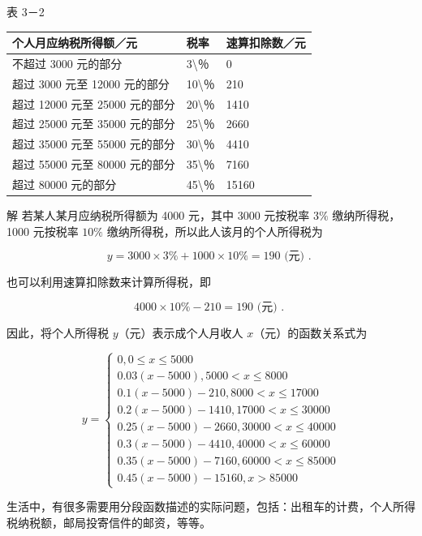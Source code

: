 \documentclass[10pt]{article}
\begin{document}
表 3－2

\begin{center}
\begin{tabular}{|l|l|l|}
\hline
个人月应纳税所得额／元 & 税率 & 速算扣除数／元 \\
\hline
不超过 3000 元的部分 & 3\textbackslash ％ & 0 \\
\hline
超过 3000 元至 12000 元的部分 & 10\textbackslash ％ & 210 \\
\hline
超过 12000 元至 25000 元的部分 & 20\textbackslash ％ & 1410 \\
\hline
超过 25000 元至 35000 元的部分 & 25\textbackslash ％ & 2660 \\
\hline
超过 35000 元至 55000 元的部分 & 30\textbackslash ％ & 4410 \\
\hline
超过 55000 元至 80000 元的部分 & 35\textbackslash ％ & 7160 \\
\hline
超过 80000 元的部分 & 45\textbackslash ％ & 15160 \\
\hline
\end{tabular}
\end{center}

解 若某人某月应纳税所得额为 4000 元，其中 3000 元按税率 \(3 \%\) 缴纳所得税， 1000 元按税率 \(10 \%\) 缴纳所得税，所以此人该月的个人所得税为

\[
y=3000 \times 3 \%+1000 \times 10 \%=190 \text { (元) . }
\]

也可以利用速算扣除数来计算所得税，即

\[
4000 \times 10 \%-210=190 \text { (元) . }
\]

因此，将个人所得税 \(y\)（元）表示成个人月收人 \(x\)（元）的函数关系式为

\[
y=\left\{\begin{array}{l}
0,0 \leqslant x \leqslant 5000 \\
0.03(x-5000), 5000<x \leqslant 8000 \\
0.1(x-5000)-210,8000<x \leqslant 17000 \\
0.2(x-5000)-1410,17000<x \leqslant 30000 \\
0.25(x-5000)-2660,30000<x \leqslant 40000 \\
0.3(x-5000)-4410,40000<x \leqslant 60000 \\
0.35(x-5000)-7160,60000<x \leqslant 85000 \\
0.45(x-5000)-15160, x>85000
\end{array}\right.
\]

生活中，有很多需要用分段函数描述的实际问题，包括：出租车的计费，个人所得税纳税额，邮局投寄信件的邮资，等等。
\end{document}

